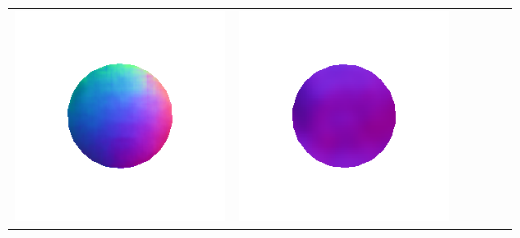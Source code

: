 \begin{tabularx}{\linewidth}{@{}Y@{}Y@{}Y@{}Y@{}Y@{}Y@{}}
\includegraphics[width=\linewidth]{semisynthetic/20150514_1_marrnet_out.png} &
\includegraphics[width=\linewidth]{semisynthetic/20150514_1_ef_out.png} \\

\end{tabularx}

